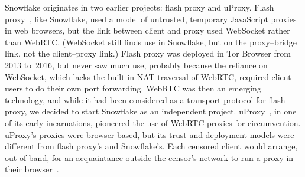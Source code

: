 \documentclass[letterpaper,twocolumn]{article}
\begin{document}
Snowflake originates in two earlier projects:
flash proxy and uProxy.
Flash proxy~\cite{Fifield2012a}, like Snowflake, used a model
of untrusted, temporary JavaScript proxies in web browsers,
but the link between client and proxy used WebSocket
rather than WebRTC.
(WebSocket still finds use in Snowflake,
but on the proxy--bridge link,
not the client--proxy link.)
Flash proxy was deployed in Tor Browser
from 2013 to~2016,
but never saw much use,
probably because the reliance on WebSocket,
which lacks the built-in NAT traversal of WebRTC,
required client users to do their own port forwarding.
WebRTC was then an emerging technology, and while
it had been considered as a transport protocol for flash proxy,
we decided to start Snowflake as an independent project.
uProxy~\cite{uproxy}, in one of its early incarnations,
pioneered the use of WebRTC proxies for circumvention.
uProxy's proxies were browser-based,
but its trust and deployment models were different
from flash proxy's and Snowflake's.
Each censored client would arrange, out of band,
for an acquaintance outside the censor's network
to run a proxy in their browser~\cite{uproxy-design-doc}.
\end{document}

